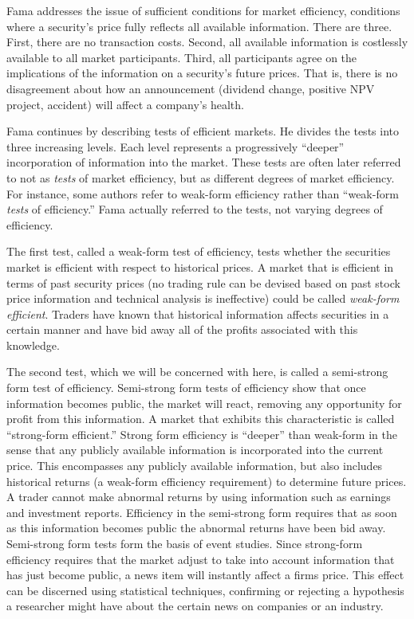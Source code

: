 Fama addresses the issue of sufficient conditions for market efficiency, conditions where a security's price fully reflects all available information. There are three. First, there are no transaction costs. Second, all available information is costlessly available to all market participants. Third, all participants agree on the implications of the information on a security's future prices. That is, there is no disagreement about how an announcement (dividend change, positive NPV project, accident) will affect a company's health.

Fama continues by describing tests of efficient markets. He divides the tests into three increasing levels. Each level represents a progressively ``deeper'' incorporation of information into the market. These tests are often later referred to not as {\em tests} of market efficiency, but as different degrees of market efficiency. For instance, some authors refer to weak-form efficiency rather than ``weak-form {\em tests} of efficiency.'' Fama actually referred to the tests, not varying degrees of efficiency.

The first test, called a weak-form test of efficiency, tests whether the securities market is efficient with respect to historical prices. A market that is efficient in terms of past security prices (no trading rule can be devised based on past stock price information and technical analysis is ineffective) could be called {\em weak-form efficient}. Traders have known that historical information affects securities in a certain manner and have bid away all of the profits associated with this knowledge.

The second test, which we will be concerned with here, is called a semi-strong form test of efficiency. Semi-strong form tests of efficiency show that once information becomes public, the market will react, removing any opportunity for profit from this information. A market that exhibits this characteristic is called ``strong-form efficient.'' Strong form efficiency is ``deeper'' than weak-form in the sense that any publicly available information is incorporated into the current price. This encompasses any publicly available information, but also includes historical returns (a weak-form efficiency requirement) to determine future prices. A trader cannot make abnormal returns by using information such as earnings and investment reports. Efficiency in the semi-strong form requires that as soon as this information becomes public the abnormal returns have been bid away. Semi-strong form tests form the basis of event studies. Since strong-form efficiency requires that the market adjust to take into account information that has just become public, a news item will instantly affect a firms price. This effect can be discerned using statistical techniques, confirming or rejecting a hypothesis a researcher might have about the certain news on companies or an industry.

